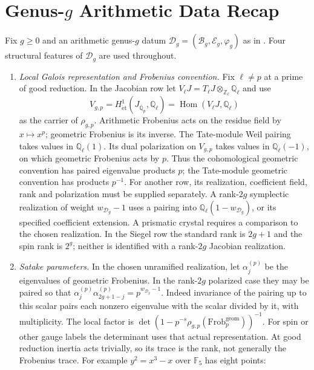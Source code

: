 \section{Genus-\(g\) Arithmetic Data Recap}
\label{v4-arith:w9-r6:datum}

Fix \(g\geq 0\) and an arithmetic genus-\(g\) datum
\(\mathcal{D}_{g}=(\mathcal{B}_{g},\mathcal{E}_{g},\varphi_{g})\) as in
. Four structural features of
\(\mathcal{D}_{g}\) are used throughout.

\begin{enumerate}
\item \emph{Local Galois representation and Frobenius convention.}
Fix $\ell\ne p$ at a prime of good reduction. In the Jacobian row
let $V_\ell J=T_\ell J\otimes_{\mathbb Z_\ell}\mathbb Q_\ell$ and use
\[
 V_{g,p}=H^1_{\mathrm{\acute et}}(J_{\overline{\mathbb Q}_p},\mathbb Q_\ell)
       =\operatorname{Hom}(V_\ell J,\mathbb Q_\ell)
\]
as the carrier of $\rho_{g,p}$. Arithmetic Frobenius acts on the
residue field by $x\mapsto x^p$; geometric Frobenius is its inverse.
The Tate-module Weil pairing takes values in $\mathbb Q_\ell(1)$.
Its dual polarization on $V_{g,p}$ takes values in
$\mathbb Q_\ell(-1)$, on which geometric Frobenius acts by $p$.
Thus the cohomological geometric convention has paired eigenvalue
products $p$; the Tate-module geometric convention has products $p^{-1}$.
For another row, its realization, coefficient field, rank and
polarization must be supplied separately. A rank-$2g$ symplectic
realization of weight $w_{\mathcal D_g}-1$ uses a pairing into
$\mathbb Q_\ell(1-w_{\mathcal D_g})$, or its specified coefficient extension.
A prismatic crystal requires a comparison to the chosen realization.
In the Siegel row the standard rank is $2g+1$ and the spin rank is
$2^g$; neither is identified with a rank-$2g$ Jacobian realization.
\item \emph{Satake parameters.} In the chosen unramified realization,
let $\alpha_j^{(p)}$ be the eigenvalues of geometric Frobenius.
In the rank-$2g$ polarized case they may be paired so that
$\alpha_j^{(p)}\alpha_{2g+1-j}^{(p)}=p^{w_{\mathcal D_g}-1}$.
Indeed invariance of the pairing up to this scalar pairs each
nonzero eigenvalue with the scalar divided by it, with multiplicity.
The local factor is $\det(1-p^{-s}\rho_{g,p}(\mathrm{Frob}_p^{\mathrm{geom}}))^{-1}$.
For spin or other gauge labels the determinant uses that actual
representation. At good reduction inertia acts trivially, so its
trace is the rank, not generally the Frobenius trace.
For example $y^2=x^3-x$ over $\mathbb F_5$ has eight points:

\end{enumerate}

